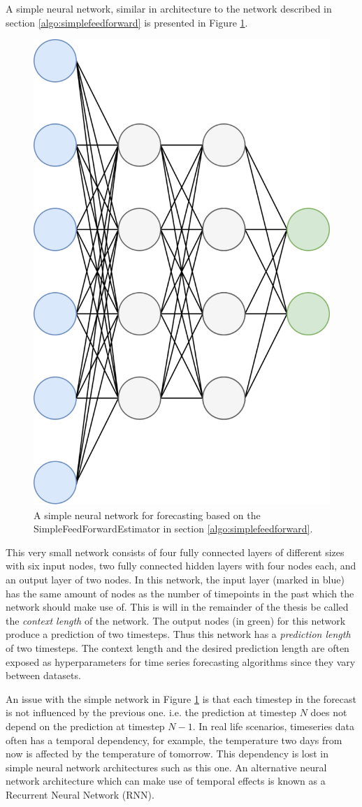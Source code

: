 A simple neural network, similar in architecture to the network described in section \ref{algo:simplefeedforward} is presented in Figure \ref{fig:simplefeedforward}.

\begin{figure}[htb]
  \centering
  \includegraphics[width=0.5\linewidth]{./img/simplefeedforward.png}
  \caption{A simple neural network for forecasting based on the SimpleFeedForwardEstimator in section \ref{algo:simplefeedforward}.}
  \label{fig:simplefeedforward}
\end{figure}
\clearpage

This very small network consists of four fully connected layers of different sizes with six input nodes, two fully connected hidden layers with four nodes each, and an output layer of two nodes. In this network, the input layer (marked in blue) has the same amount of nodes as the number of timepoints in the past which the network should make use of. This is will in the remainder of the thesis be called the \textit{context length} of the network. The output nodes (in green) for this network produce a prediction of two timesteps. Thus this network has a \textit{prediction length} of two timesteps. The context length and the desired prediction length are often exposed as hyperparameters for time series forecasting algorithms since they vary between datasets.

An issue with the simple network in Figure \ref{fig:simplefeedforward} is that each timestep in the forecast is not influenced by the previous one. i.e. the prediction at timestep \(N\) does not depend on the prediction at timestep \(N-1\). In real life scenarios, timeseries data often has a temporal dependency, for example, the temperature two days from now is affected by the temperature of tomorrow. This dependency is lost in simple neural network architectures such as this one. An alternative neural network architecture which can make use of temporal effects is known as a Recurrent Neural Network (RNN).

